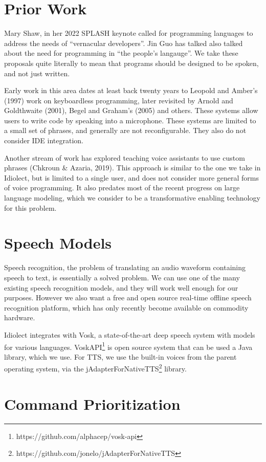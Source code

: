 \documentclass[conference]{IEEEtran}
\begin{document}
\section{Prior Work}

Mary Shaw, in her 2022 SPLASH keynote called for programming languages to address the needs of ``vernacular developers''. Jin Guo has talked also talked about the need for programming in ``the people's langauge''. We take these proposals quite literally to mean that programs should be designed to be spoken, and not just written.

Early work in this area dates at least back twenty years to Leopold and Amber's (1997) work on keyboardless programming, later revisited by Arnold and Goldthwaite (2001), Begel and Graham's (2005) and others. These systems allow users to write code by speaking into a microphone. These systems are limited to a small set of phrases, and generally are not reconfigurable. They also do not consider IDE integration.

Another stream of work has explored teaching voice assistants to use custom phrases (Chkroun \& Azaria, 2019). This approach is similar to the one we take in Idiolect, but is limited to a single user, and does not consider more general forms of voice programming. It also predates most of the recent progress on large language modeling, which we consider to be a transformative enabling technology for this problem.

\section{Speech Models}

Speech recognition, the problem of translating an audio waveform containing speech to text, is essentially a solved problem. We can use one of the many existing speech recognition models, and they will work well enough for our purposes. However we also want a free and open source real-time offline speech recognition platform, which has only recently become available on commodity hardware.

Idiolect integrates with Vosk, a state-of-the-art deep speech system with models for various languages. VoskAPI\footnote{https://github.com/alphacep/vosk-api} is open source system that can be used a Java library, which we use. For TTS, we use the built-in voices from the parent operating system, via the jAdapterForNativeTTS\footnote{https://github.com/jonelo/jAdapterForNativeTTS} library.

\section{Command Prioritization}
\end{document}
